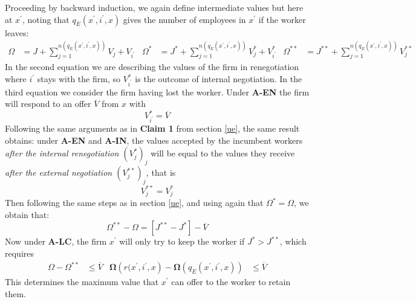 Proceeding by backward induction, we again define intermediate values but
here at $x^{\prime}$, noting that $q_E\left(x^{\prime},i^{\prime},x\right)$
gives the number of employees in $x^{\prime}$ if the worker leaves:
\begin{align*}
\Omega &
=J+\sum_{j=1}^{n\left(q_E\left(x^{\prime},i^{\prime},x\right)%
\right)}V_{j}+V_{i^{\prime}} &
\Omega^{\ast} &
=J^{\ast}+\sum_{j=1}^{n\left(q_E\left(x^{\prime},i^{\prime},x\right)%
\right)}V_{j}^{\ast}+V_{i^{\prime}}^{\ast} &
\Omega^{\ast\ast} &
=J^{\ast\ast}+\sum_{j=1}^{n\left(q_E\left(x^{\prime},i^{\prime},x\right)%
\right)}V_{j}^{\ast\ast}
\end{align*}
In the second equation we are describing the values of the firm in
renegotiation where $i^{\prime}$ stays with the firm, so $%
V_{i^{\prime}}^{\ast}$ is the outcome of internal negotiation. In the third
equation we consider the firm having lost the worker. Under \textbf{A-EN} the
firm will respond to an offer $\overline{V}$ from $x$ with
\begin{equation*}
V_{i^{\prime}}^{\ast}=\overline{V}
\end{equation*}
Following the same arguments as in \textbf{Claim 1} from section \ref{ue}, the same result obtains: under
\textbf{A-EN} and \textbf{A-IN}, the values accepted by the incumbent workers \emph{after the
internal renegotiation $(V_{j}^{\ast})_j$ }will be equal to the
values they receive \emph{after the} \emph{external negotiation $%
(V_{j}^{\ast\ast})_j$, }that is
\begin{equation*}
V_{j}^{\ast\ast}=V_{j}^{\ast}
\end{equation*}
Then following the same steps as in section \ref{ue}, and using again that $\Omega^* = \Omega$, we obtain that:
\begin{equation*}
\Omega^{\ast\ast}-\Omega=\left[J^{\ast\ast}-J^{\ast}\right]-\overline{V}
\end{equation*}
Now under \textbf{A-LC}, the firm $x^{\prime }$ will only try to keep the
worker if $J^{\ast }>J^{\ast \ast }$, which requires
\begin{align*}
\Omega -\Omega ^{\ast \ast }& \leq \overline{V} &
\boldsymbol{\Omega} \left( r(x^{\prime },i^{\prime},x\right) -\boldsymbol{\Omega }%
\left( q_{E}\left( x^{\prime },i^{\prime },x\right) \right) & \leq \overline{V}
\end{align*}
This determines the maximum value that $x^{\prime }$ can offer to the worker
to retain them.

